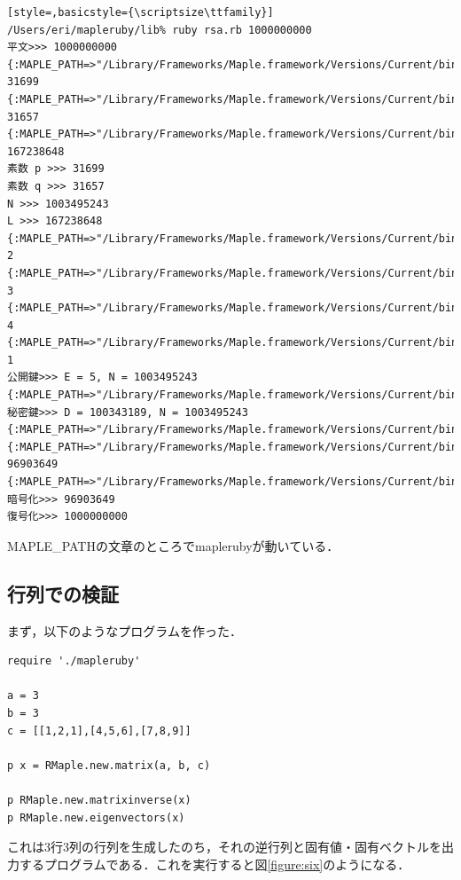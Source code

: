 \begin{lstlisting}[style=,basicstyle={\scriptsize\ttfamily}]
/Users/eri/mapleruby/lib% ruby rsa.rb 1000000000
平文>>> 1000000000
{:MAPLE_PATH=>"/Library/Frameworks/Maple.framework/Versions/Current/bin/maple"}
31699
{:MAPLE_PATH=>"/Library/Frameworks/Maple.framework/Versions/Current/bin/maple"}
31657
{:MAPLE_PATH=>"/Library/Frameworks/Maple.framework/Versions/Current/bin/maple"}
167238648
素数 p >>> 31699
素数 q >>> 31657
N >>> 1003495243
L >>> 167238648
{:MAPLE_PATH=>"/Library/Frameworks/Maple.framework/Versions/Current/bin/maple"}
2
{:MAPLE_PATH=>"/Library/Frameworks/Maple.framework/Versions/Current/bin/maple"}
3
{:MAPLE_PATH=>"/Library/Frameworks/Maple.framework/Versions/Current/bin/maple"}
4
{:MAPLE_PATH=>"/Library/Frameworks/Maple.framework/Versions/Current/bin/maple"}
1
公開鍵>>> E = 5, N = 1003495243
{:MAPLE_PATH=>"/Library/Frameworks/Maple.framework/Versions/Current/bin/maple"}
秘密鍵>>> D = 100343189, N = 1003495243
{:MAPLE_PATH=>"/Library/Frameworks/Maple.framework/Versions/Current/bin/maple"}
{:MAPLE_PATH=>"/Library/Frameworks/Maple.framework/Versions/Current/bin/maple"}
96903649
{:MAPLE_PATH=>"/Library/Frameworks/Maple.framework/Versions/Current/bin/maple"}
暗号化>>> 96903649
復号化>>> 1000000000
\end{lstlisting}\begin{description}
\item[MAPLE\_PATHの文章のところでmaplerubyが動いている．
]\end{description}
\subsection{行列での検証}
まず，以下のようなプログラムを作った．
\begin{lstlisting}[style=customRuby,basicstyle={\scriptsize\ttfamily}]
require './mapleruby'

a = 3
b = 3
c = [[1,2,1],[4,5,6],[7,8,9]]

p x = RMaple.new.matrix(a, b, c)

p RMaple.new.matrixinverse(x)
p RMaple.new.eigenvectors(x)
\end{lstlisting}
これは3行3列の行列を生成したのち，それの逆行列と固有値・固有ベクトルを出力するプログラムである．これを実行すると図\ref{figure:six}のようになる．

